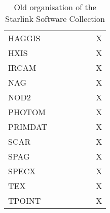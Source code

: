 {\begin{table}
\begin{center}
\begin{tabular}{||l||c|c|c|c|c||c||}
HAGGIS    &   &   &   &   &   & X \\
HXIS      &   &   &   &   &   & X \\
IRCAM     &   &   &   &   &   & X \\
NAG       &   &   &   &   &   & X \\
NOD2      &   &   &   &   &   & X \\
PHOTOM    &   &   &   &   &   & X \\
PRIMDAT   &   &   &   &   &   & X \\
SCAR      &   &   &   &   &   & X \\
SPAG      &   &   &   &   &   & X \\
SPECX     &   &   &   &   &   & X \\
TEX       &   &   &   &   &   & X \\
TPOINT    &   &   &   &   &   & X \\
\hline
\end {tabular}
\caption {Old organisation of the Starlink Software Collection}
\end{center}
\end{table}}



